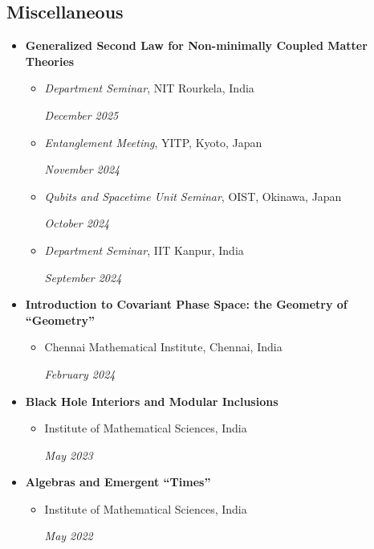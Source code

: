 \documentclass[11pt, letterpaper]{article}
\newcommand{\entry}[4]{
	\ifthenelse{\isempty{#3}}
	{\slimentry{#1}{#2}}{
		\begin{minipage}[t]{.25\linewidth}
			\hfill #1
		\end{minipage}
		\hfill \vline \hfill
		\begin{minipage}[t]{.7\linewidth}
			{\bf #2} \\ #3 \\ \footnotesize{#4}
		\end{minipage}\\
		\vspace{.2cm}
}}
\newcommand{\slimentry}[2]{
	\begin{minipage}[t]{.25\linewidth}
		\hfill \textsc{#1}
	\end{minipage}
	\hfill \vline \hfill
	\begin{minipage}[t]{.7\linewidth}
		#2
	\end{minipage}\\
	\vspace{.25cm}
}%
\newcommand{\colentry}[2]{
	\begin{minipage}[t]{.75\linewidth}
		#1
	\end{minipage}
	\hfill
	\begin{minipage}[t]{.22\linewidth}
		\hfill #2
	\end{minipage}
}%
\newcommand{\imsc}{Institute of Mathematical Sciences}
\begin{document}
	\subsection{Miscellaneous}
	\begin{itemize}[itemsep=10pt]
		\item \textbf{Generalized Second Law for Non-minimally Coupled Matter Theories}
		\begin{itemize}[nolistsep, itemsep=5pt]
			\item \colentry{\emph{Department Seminar}, NIT Rourkela, India}{\textit{December 2025}}
			\item \colentry{\emph{Entanglement Meeting}, YITP, Kyoto, Japan}{\textit{November 2024}}
			\item \colentry{\emph{Qubits and Spacetime Unit Seminar}, OIST, Okinawa, Japan}{\textit{October 2024}}
			\item \colentry{\emph{Department Seminar}, IIT Kanpur, India}{\textit{September 2024}}
		\end{itemize}
		
		\item \textbf{Introduction to Covariant Phase Space: the Geometry of ``Geometry''}
		\begin{itemize}[nolistsep]
			\item \colentry{Chennai Mathematical Institute, Chennai, India}{\textit{February 2024}}
		\end{itemize}
		
		\item \textbf{Black Hole Interiors and Modular Inclusions}
		\begin{itemize}[nolistsep]
			\item \colentry{\imsc, India}{\textit{May 2023}}
		\end{itemize}
		
		\item \textbf{Algebras and Emergent ``Times''}
		\begin{itemize}[nolistsep]
			\item \colentry{\imsc, India}{\textit{May 2022}}
		\end{itemize}
	\end{itemize}
	
\end{document}
